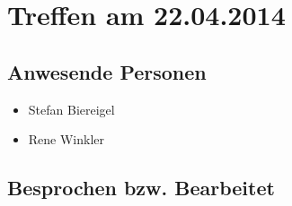\chapter{Treffen am 22.04.2014}
\section{Anwesende Personen}
\begin{itemize}
	\item Stefan Biereigel
	\item Rene Winkler
\end{itemize}

\section{Besprochen bzw. Bearbeitet}
